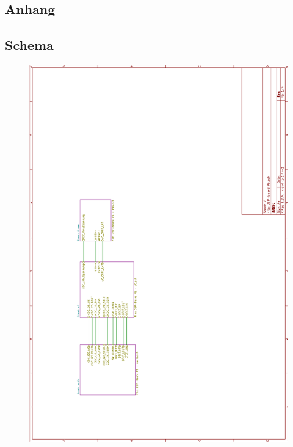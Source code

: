 \begin{appendix} %
\section{Anhang}
\label{sec:Anhang}

\subsection{Schema}
\label{app:Schema}

\begin{figure}[h!]
	\centering
	\includegraphics[width=0.95\linewidth]{appendix/DSP-Board-Schema-V1-1(1).pdf}
\end{figure}


\end{appendix}
